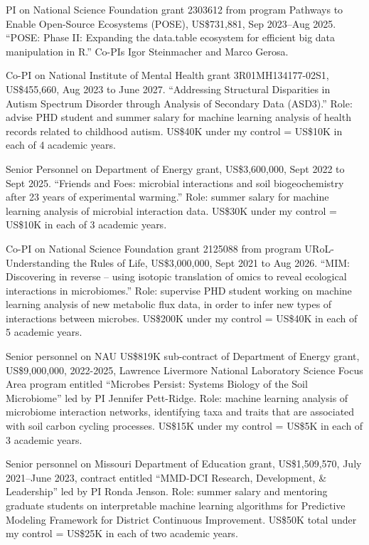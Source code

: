 \documentclass[margin,line]{res}
\begin{document}
\begin{resume}
PI on National Science Foundation grant 2303612 from program Pathways to Enable Open-Source Ecosystems (POSE), US\$731,881, Sep
2023--Aug 2025. ``POSE: Phase II: Expanding the data.table ecosystem
for efficient big data manipulation in R.'' Co-PIs Igor Steinmacher
and Marco Gerosa.

Co-PI on National Institute of Mental Health grant 3R01MH134177-02S1,
US\$455,660, Aug 2023 to June 2027. ``Addressing Structural Disparities in Autism Spectrum Disorder through Analysis of Secondary Data (ASD3).'' Role: advise PHD student and summer salary for
machine learning analysis of health records related to childhood
autism. US\$40K under my control = US\$10K in each of 4 academic
years.

Senior Personnel on Department of Energy grant, US\$3,600,000, Sept 2022 to
Sept 2025. ``Friends and Foes: microbial interactions and soil
biogeochemistry after 23 years of experimental warming.'' Role: summer
salary for machine learning analysis of microbial interaction data.
US\$30K under my control = US\$10K in each of 3 academic years.

Co-PI on National Science Foundation grant 2125088 from program URoL-Understanding the Rules of Life, US\$3,000,000, Sept 2021
to Aug 2026. ``MIM: Discovering in reverse – using isotopic
translation of omics to reveal ecological interactions in
microbiomes.'' Role: supervise PHD student working on machine learning
analysis of new metabolic flux data, in order to infer new types of
interactions between microbes. US\$200K under my control = US\$40K in
each of 5 academic years.

Senior personnel on NAU US\$819K sub-contract of Department of Energy
grant, US\$9,000,000, 2022-2025, Lawrence Livermore National
Laboratory Science Focus Area program entitled ``Microbes Persist:
Systems Biology of the Soil Microbiome'' led by PI Jennifer
Pett-Ridge. Role: machine learning analysis of microbiome interaction
networks, identifying taxa and traits that are associated with soil
carbon cycling processes. US\$15K under my control = US\$5K in each of
3 academic years.

Senior personnel on Missouri Department of Education grant,
US\$1,509,570, July 2021--June 2023, contract entitled ``MMD-DCI
Research, Development, \& Leadership'' led by PI Ronda Jenson. Role:
summer salary and mentoring graduate students on interpretable machine
learning algorithms for Predictive Modeling Framework for District
Continuous Improvement. US\$50K total under my control = US\$25K in
each of two academic years.


\end{resume}
\end{document}
